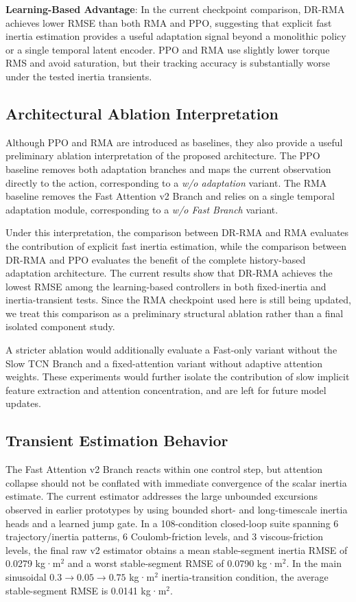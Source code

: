 \documentclass[lettersize,journal]{IEEEtran}
\begin{document}
\textbf{Learning-Based Advantage}: In the current checkpoint comparison, DR-RMA achieves lower RMSE than both RMA and PPO, suggesting that explicit fast inertia estimation provides a useful adaptation signal beyond a monolithic policy or a single temporal latent encoder. PPO and RMA use slightly lower torque RMS and avoid saturation, but their tracking accuracy is substantially worse under the tested inertia transients.

\subsection{Architectural Ablation Interpretation}

Although PPO and RMA are introduced as baselines, they also provide a useful preliminary ablation interpretation of the proposed architecture. The PPO baseline removes both adaptation branches and maps the current observation directly to the action, corresponding to a \emph{w/o adaptation} variant. The RMA baseline removes the Fast Attention v2 Branch and relies on a single temporal adaptation module, corresponding to a \emph{w/o Fast Branch} variant.

Under this interpretation, the comparison between DR-RMA and RMA evaluates the contribution of explicit fast inertia estimation, while the comparison between DR-RMA and PPO evaluates the benefit of the complete history-based adaptation architecture. The current results show that DR-RMA achieves the lowest RMSE among the learning-based controllers in both fixed-inertia and inertia-transient tests. Since the RMA checkpoint used here is still being updated, we treat this comparison as a preliminary structural ablation rather than a final isolated component study.

A stricter ablation would additionally evaluate a Fast-only variant without the Slow TCN Branch and a fixed-attention variant without adaptive attention weights. These experiments would further isolate the contribution of slow implicit feature extraction and attention concentration, and are left for future model updates.

\subsection{Transient Estimation Behavior}
\label{sec:transient_estimation}

The Fast Attention v2 Branch reacts within one control step, but attention collapse should not be conflated with immediate convergence of the scalar inertia estimate. The current estimator addresses the large unbounded excursions observed in earlier prototypes by using bounded short- and long-timescale inertia heads and a learned jump gate. In a 108-condition closed-loop suite spanning 6 trajectory/inertia patterns, 6 Coulomb-friction levels, and 3 viscous-friction levels, the final raw v2 estimator obtains a mean stable-segment inertia RMSE of 0.0279 kg·m$^2$ and a worst stable-segment RMSE of 0.0790 kg·m$^2$. In the main sinusoidal $0.3 \rightarrow 0.05 \rightarrow 0.75$ kg·m$^2$ inertia-transition condition, the average stable-segment RMSE is 0.0141 kg·m$^2$.
\end{document}
